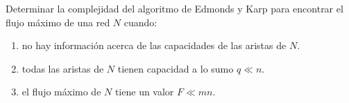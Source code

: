 
\item Determinar la complejidad del algoritmo de Edmonds y Karp para encontrar el flujo máximo de una red $N$ cuando:
 \begin{enumerate}[label=$\alph*)$,ref=$\alph*)$]
  \item no hay información acerca de las capacidades de las aristas de $N$.
  \item todas las aristas de $N$ tienen capacidad a lo sumo $q \ll n$.
  \item el flujo máximo de $N$ tiene un valor $F \ll mn$.
 \end{enumerate}


